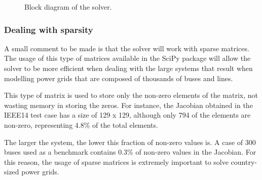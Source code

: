 \begin{figure}[H]
\begin{tikzpicture}[node distance=1.25cm]
    \end{tikzpicture}
    \caption{Block diagram of the solver.}
    \label{fig:block}
    \end{figure}

\subsubsection{Dealing with sparsity}

A small comment to be made is that the solver will work with sparse matrices. The usage of this type of matrices
available in the SciPy package \cite{2020SciPy-NMeth} will allow the solver to be more efficient when dealing with the large systems that result when 
modelling power grids that are composed of thousands of buses and lines. 

This type of matrix is used to store only the non-zero elements of the matrix, not wasting memory in storing the zeros. For instance, the Jacobian
obtained in the IEEE14 test case has a size of 129 x 129, although only 794 of the elements are non-zero, representing 4.8\% of the total elements.

The larger the system, the lower this fraction of non-zero values is. A case of 300 buses used as a benchmark contains 0.3\% of non-zero values in the Jacobian.
For this reason, the usage of sparse matrices is extremely important to solve country-sized power grids.